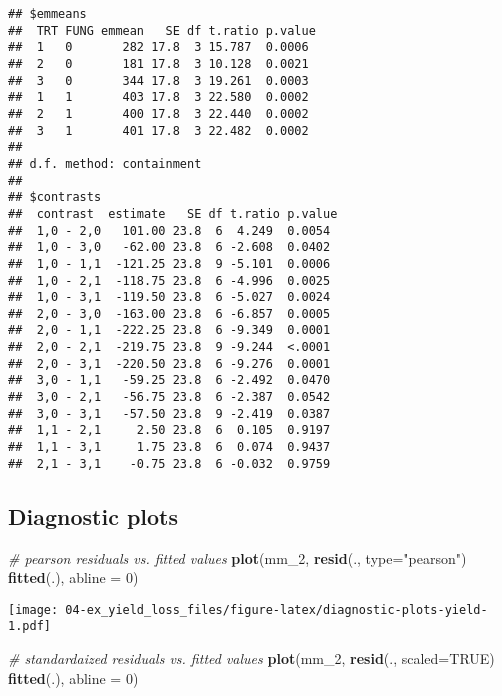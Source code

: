 \documentclass[]{book}
\newenvironment{Shaded}{\begin{snugshade}}{\end{snugshade}}
\newcommand{\CommentTok}[1]{\textcolor[rgb]{0.56,0.35,0.01}{\textit{#1}}}
\newcommand{\DataTypeTok}[1]{\textcolor[rgb]{0.13,0.29,0.53}{#1}}
\newcommand{\DecValTok}[1]{\textcolor[rgb]{0.00,0.00,0.81}{#1}}
\newcommand{\KeywordTok}[1]{\textcolor[rgb]{0.13,0.29,0.53}{\textbf{#1}}}
\newcommand{\NormalTok}[1]{#1}
\newcommand{\OperatorTok}[1]{\textcolor[rgb]{0.81,0.36,0.00}{\textbf{#1}}}
\newcommand{\OtherTok}[1]{\textcolor[rgb]{0.56,0.35,0.01}{#1}}
\newcommand{\StringTok}[1]{\textcolor[rgb]{0.31,0.60,0.02}{#1}}
\begin{document}
\begin{verbatim}
## $emmeans
##  TRT FUNG emmean   SE df t.ratio p.value
##  1   0       282 17.8  3 15.787  0.0006 
##  2   0       181 17.8  3 10.128  0.0021 
##  3   0       344 17.8  3 19.261  0.0003 
##  1   1       403 17.8  3 22.580  0.0002 
##  2   1       400 17.8  3 22.440  0.0002 
##  3   1       401 17.8  3 22.482  0.0002 
## 
## d.f. method: containment 
## 
## $contrasts
##  contrast  estimate   SE df t.ratio p.value
##  1,0 - 2,0   101.00 23.8  6  4.249  0.0054 
##  1,0 - 3,0   -62.00 23.8  6 -2.608  0.0402 
##  1,0 - 1,1  -121.25 23.8  9 -5.101  0.0006 
##  1,0 - 2,1  -118.75 23.8  6 -4.996  0.0025 
##  1,0 - 3,1  -119.50 23.8  6 -5.027  0.0024 
##  2,0 - 3,0  -163.00 23.8  6 -6.857  0.0005 
##  2,0 - 1,1  -222.25 23.8  6 -9.349  0.0001 
##  2,0 - 2,1  -219.75 23.8  9 -9.244  <.0001 
##  2,0 - 3,1  -220.50 23.8  6 -9.276  0.0001 
##  3,0 - 1,1   -59.25 23.8  6 -2.492  0.0470 
##  3,0 - 2,1   -56.75 23.8  6 -2.387  0.0542 
##  3,0 - 3,1   -57.50 23.8  9 -2.419  0.0387 
##  1,1 - 2,1     2.50 23.8  6  0.105  0.9197 
##  1,1 - 3,1     1.75 23.8  6  0.074  0.9437 
##  2,1 - 3,1    -0.75 23.8  6 -0.032  0.9759
\end{verbatim}

\hypertarget{diagnostic-plots-2}{%
\subsection{Diagnostic plots}\label{diagnostic-plots-2}}

\begin{Shaded}
\begin{Highlighting}[]
\CommentTok{# pearson residuals vs. fitted values}
\KeywordTok{plot}\NormalTok{(mm_}\DecValTok{2}\NormalTok{, }\KeywordTok{resid}\NormalTok{(., }\DataTypeTok{type=}\StringTok{"pearson"}\NormalTok{) }\OperatorTok{~}\StringTok{ }\KeywordTok{fitted}\NormalTok{(.), }\DataTypeTok{abline =} \DecValTok{0}\NormalTok{)}
\end{Highlighting}
\end{Shaded}

\texttt{[image: 04-ex\_yield\_loss\_files/figure-latex/diagnostic-plots-yield-1.pdf]}

\begin{Shaded}
\begin{Highlighting}[]
\CommentTok{# standardaized residuals vs. fitted values}
\KeywordTok{plot}\NormalTok{(mm_}\DecValTok{2}\NormalTok{, }\KeywordTok{resid}\NormalTok{(., }\DataTypeTok{scaled=}\OtherTok{TRUE}\NormalTok{) }\OperatorTok{~}\StringTok{ }\KeywordTok{fitted}\NormalTok{(.), }\DataTypeTok{abline =} \DecValTok{0}\NormalTok{)}
\end{Highlighting}
\end{Shaded}
\end{document}

